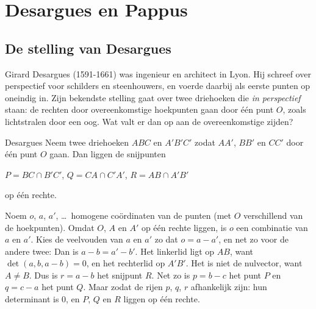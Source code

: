 
\begin{oefeningen}
\end{oefeningen}

\section{Desargues en Pappus}

\subsection{De stelling van Desargues}

Girard Desargues (1591-1661) was ingenieur en architect in Lyon. Hij schreef over perspectief voor schilders en steenhouwers, en voerde daarbij als eerste punten op oneindig in. Zijn bekendste stelling gaat over twee driehoeken die \textit{in perspectief} staan: de rechten door overeenkomstige hoekpunten gaan door één punt $O$, zoals lichtstralen door een oog. Wat valt er dan op aan de overeenkomstige zijden?

\begin{theorie}
\begin{stelling}{Desargues}
Neem twee driehoeken $ABC$ en $A'B'C'$ zodat $AA'$, $BB'$ en $CC'$ door één punt $O$ gaan. Dan liggen de snijpunten

\vspace{1mm}
\qquad $P = BC \cap B'C'$, \quad $Q = CA \cap C'A'$, \quad $R = AB \cap A'B'$

\vspace{1mm}
op één rechte.
\end{stelling}

\begin{bewijs}
Noem $o$, $a$, $a'$, \dots\ homogene coördinaten van de punten (met $O$ verschillend van de hoekpunten). Omdat $O$, $A$ en $A'$ op één rechte liggen, is $o$ een combinatie van $a$ en $a'$. Kies de veelvouden van $a$ en $a'$ zo dat $o = a - a'$, en net zo voor de andere twee:
Dan is $a - b = a' - b'$. Het linkerlid ligt op $AB$, want $\det(a, b, a - b) = 0$, en het rechterlid op $A'B'$. Het is niet de nulvector, want $A \neq B$. Dus is $r = a - b$ het snijpunt $R$. Net zo is $p = b - c$ het punt $P$ en $q = c - a$ het punt $Q$. Maar
zodat de rijen $p$, $q$, $r$ afhankelijk zijn: hun determinant is 0, en $P$, $Q$ en $R$ liggen op één rechte.
\end{bewijs}
\end{theorie}

